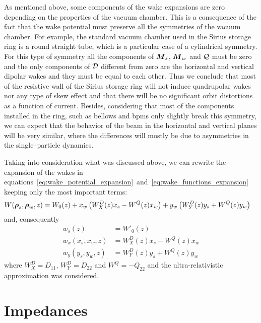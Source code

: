     As mentioned above, some components of the wake expansions are zero depending on the properties of the vacuum chamber. This is a consequence of the fact that the wake potential must preserve all the symmetries of the vacuum chamber.
    For example, the standard vacuum chamber used in the Sirius storage ring is a round straight tube, which is a particular case of a cylindrical symmetry. For this type of symmetry all the components of $\boldsymbol{M}_s$, $\boldsymbol{M}_w$ and $\mathcal{Q}$ must be zero and the only components of $\mathcal{D}$ different from zero are the horizontal and vertical dipolar wakes and they must be equal to each other. Thus we conclude that most of the resistive wall of the Sirius storage ring will not induce quadrupolar wakes nor any type of skew effect and that there will be no significant orbit distortions as a function of current. Besides, considering that most of the components installed in the ring, such as bellows and \glspl{bpm} only slightly break this symmetry, we can expect that the behavior of the beam in the horizontal and vertical planes will be very similar, where the differences will mostly be due to asymmetries in the single--particle dynamics.

    Taking into consideration what was discussed above, we can rewrite the expansion of the wakes in equations~\eqref{eq:wake_potential_expansion}~and~\eqref{eq:wake_functions_expansion} keeping only the most important terms:
    \begin{align}\label{eq:important_wake_potential}
  	  	W(\boldsymbol{\rho}_s, \boldsymbol{\rho}_w, z) &=
	  		W_0(z) +
			x_w\left(W^D_X(z)x_s - W^Q(z)x_w\right) +
			y_w\left(W^D_Y(z)y_s + W^Q(z)y_w\right)
    \end{align}
    and, consequently
    \begin{align}\label{eq:important_wakes}\nonumber
  		w_s(z) &= W'_0(z) \\
		w_x(x_s, x_w, z) &= W^D_X(z)x_s - W^Q(z)x_w \\\nonumber
		w_y(y_s, y_w, z) &= W^D_Y(z)y_s + W^Q(z)y_w
    \end{align}
    where $W^D_X = D_{11}$, $W^D_Y = D_{22}$ and $W^Q = -Q_{22}$ and the ultra-relativistic approximation was considered.

\section{Impedances}\label{sec:impedances}

